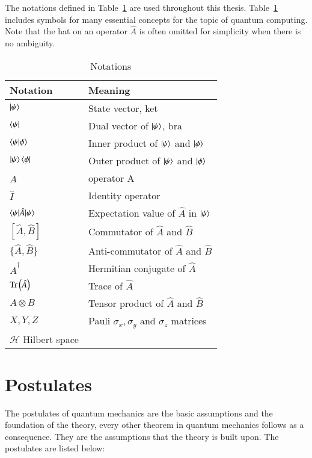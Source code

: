 The notations defined in Table~\ref{tab:notations} are used throughout this thesis. Table~\ref{tab:notations} includes symbols for many essential concepts for the topic of quantum computing. Note that the hat on an operator $ \hat A $ is often omitted for simplicity when there is no ambiguity. 
\begin{table}[ht]
	\centering
	\caption{Notations}
	\label{tab:notations}

	\begin{tabular}{ll}
		\toprule
		Notation & Meaning \\
		\midrule
		$ \ket{\psi} $ & State vector, ket \\
		$ \bra{\psi} $ & Dual vector of $ \ket{\psi} $, bra \\
		$ \braket{\psi|\phi} $ & Inner product of $ \ket{\psi} $ and $ \ket{\phi} $ \\
		$ \ket{\psi}\bra{\phi} $ & Outer product of $ \ket{\psi} $ and $ \ket{\phi} $ \\
		$ \hat A$ & operator A \\
		$ \hat I $ & Identity operator \\
		$ \braket{\psi|\hat A|\psi} $ & Expectation value of $ \hat A $ in $ \ket{\psi} $ \\
		$ [\hat A, \hat B] $ & Commutator of $ \hat A $ and $ \hat B $ \\
		$ \{\hat A, \hat B\} $ & Anti-commutator of $ \hat A $ and $ \hat B $ \\
		$ \hat A^\dagger $ & Hermitian conjugate of $ \hat A $ \\
		$ \text{Tr}\left(\hat A\right) $ & Trace of $ \hat A $ \\
		$ A \otimes B $ & Tensor product of $ \hat A $ and $ \hat B $ \\
		$ X,Y,Z $ & Pauli $ \sigma_x, \sigma_y \text{ and } \sigma_z $ matrices \\
            $ \mathcal{H}$ Hilbert space \\
	\bottomrule	
	\end{tabular}
\end{table}

\section{Postulates}
\label{sec:posulates}

The postulates of quantum mechanics are the basic assumptions and the foundation of the theory, every other theorem in quantum mechanics follows as a consequence. They are the assumptions that the theory is built upon. The postulates are listed below:


